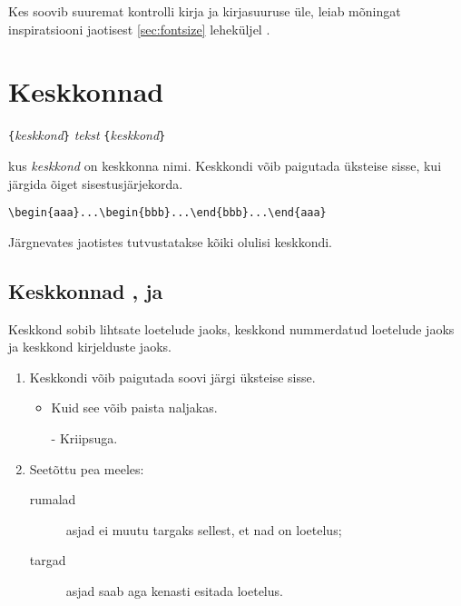 Kes soovib suuremat kontrolli kirja ja kirjasuuruse üle, leiab mõningat
inspiratsiooni jaotisest \ref{sec:fontsize} leheküljel
\pageref{sec:fontsize}.

\section{Keskkonnad} \label{env}

\begin{lscommand}
\verb|{|\emph{keskkond}\verb|}|\quad
   \emph{tekst}\quad
{}\verb|{|\emph{keskkond}\verb|}|
\end{lscommand}
\noindent kus \emph{keskkond} on keskkonna nimi. Keskkondi võib
paigutada üksteise sisse, kui järgida õiget sisestusjärjekorda.
\begin{code}
\verb|\begin{aaa}...\begin{bbb}...\end{bbb}...\end{aaa}|
\end{code}

\noindent Järgnevates jaotistes tutvustatakse kõiki olulisi keskkondi.

\subsection{Keskkonnad ,  ja }

Keskkond  sobib lihtsate loetelude jaoks, keskkond
 nummerdatud loetelude jaoks ja keskkond 
kirjelduste jaoks. 

\begin{example}
\flushleft
\begin{enumerate}
\item Keskkondi võib paigutada
soovi järgi üksteise sisse.
\begin{itemize}
\item Kuid see võib paista
naljakas.
\item[-] Kriipsuga.
\end{itemize}
\item Seetõttu pea meeles:
\begin{description}
\item[rumalad] asjad ei muutu
targaks sellest, et nad on
loetelus;
\item[targad] asjad saab aga
kenasti esitada loetelus.
\end{description}
\end{enumerate}
\end{example}

